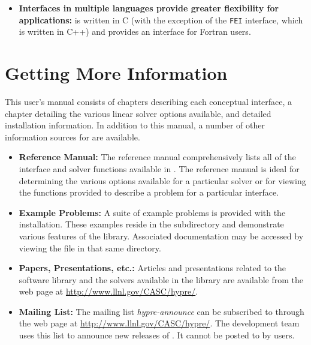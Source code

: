 \begin{itemize}
\item
{\bf Interfaces in multiple languages provide greater flexibility for
applications:} \hypre{} is written in C (with the exception of the {\tt FEI}
interface, which is written in C++) and provides an interface for Fortran users.

\end{itemize}


\section{Getting More Information}

This user's manual consists of chapters describing each conceptual interface, a
chapter detailing the various linear solver options available, and detailed
installation information.  In addition to this manual, a number of other
information sources for \hypre{} are available.

\begin{itemize}

\item
{\bf Reference Manual:} The reference manual comprehensively lists all of the
interface and solver functions available in \hypre{}.  The reference manual is
ideal for determining the various options available for a particular solver or
for viewing the functions provided to describe a problem for a particular
interface.

\item{\bf Example Problems:} A suite of example problems is provided with the
\hypre{} installation.  These examples reside in the 
subdirectory and demonstrate various features of the \hypre{} library.
Associated documentation may be accessed by viewing the  file
in that same directory.

\item
{\bf Papers, Presentations, etc.:} Articles and presentations related to the
\hypre{} software library and the solvers available in the library are available
from the \hypre{} web page at \url{http://www.llnl.gov/CASC/hypre/}.

\item{\bf Mailing List:} The mailing list {\sl hypre-announce} can be subscribed
to through the \hypre{} web page at \url{http://www.llnl.gov/CASC/hypre/}.  The
development team uses this list to announce new releases of \hypre{}.  It cannot
be posted to by users.

\end{itemize}

